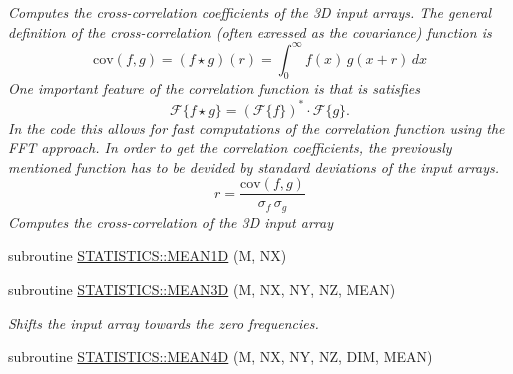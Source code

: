 \begin{DoxyCompactItemize}
\begin{DoxyCompactList}\small\item\em Computes the cross-\/correlation coefficients of the 3D input arrays. The general definition of the cross-\/correlation (often exressed as the covariance) function is \[\mathrm{cov}(f,g)=\left(f\star g\right)(r)=\int_0^{\infty}f(x)\,g(x+r)\,dx \] One important feature of the correlation function is that is satisfies \[\mathcal{F}\{f\star g\}=(\mathcal{F}\{f\})^*\cdot\mathcal{F}\{g\}. \] In the code this allows for fast computations of the correlation function using the FFT approach. In order to get the correlation coefficients, the previously mentioned function has to be devided by standard deviations of the input arrays. \[r=\frac{\mathrm{cov}(f,g)}{\sigma_f\,\sigma_g} \] Computes the cross-\/correlation of the 3D input array \end{DoxyCompactList}\item 
subroutine \hyperlink{namespaceSTATISTICS_a0e5d171eb0600a926c45883d16628bc5}{STATISTICS::MEAN1D} (M, NX)
\item 
subroutine \hyperlink{namespaceSTATISTICS_a95b82ef7e03a03d4b2ff850710558843}{STATISTICS::MEAN3D} (M, NX, NY, NZ, MEAN)
\begin{DoxyCompactList}\small\item\em Shifts the input array towards the zero frequencies. \end{DoxyCompactList}\item 
subroutine \hyperlink{namespaceSTATISTICS_a2e2608ba8eefb8af3541e4e9a09a6482}{STATISTICS::MEAN4D} (M, NX, NY, NZ, DIM, MEAN)
\end{DoxyCompactItemize}
